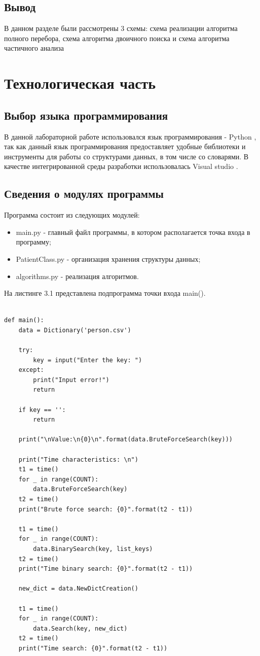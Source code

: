 \documentclass[12pt]{report}
\begin{document}
\section{Вывод}
В данном разделе были рассмотрены 3 схемы: схема реализации алгоритма полного перебора, схема алгоритма двоичного поиска и схема алгоритма частичного анализа 

\chapter{Технологическая часть}
\section{Выбор языка программирования}
В данной лабораторной работе использовался язык программирования - Python \cite{Python}, так как данный язык программирования предоставляет удобные библиотеки и инструменты для работы со структурами данных, в том числе со словарями. В качестве интегрированной среды разработки использовалась Visual studio \cite{Vs}.  

\section{Сведения о модулях программы}
Программа состоит из следующих модулей:
\begin{itemize}
	\item main.py - главный файл программы, в котором располагается точка входа в программу;
	\item PatientClass.py - организация хранения структуры данных;
	\item algorithms.py - реализация алгоритмов.
\end{itemize}

На листинге 3.1 представлена подпрограмма точки входа main().
\begin{lstlisting}[label=some-code,caption= Код подпрограммы main()]

def main():
    data = Dictionary('person.csv')

    try:
        key = input("Enter the key: ")
    except:
        print("Input error!")
        return

    if key == '':
        return

    print("\nValue:\n{0}\n".format(data.BruteForceSearch(key)))

    print("Time characteristics: \n")
    t1 = time()
    for _ in range(COUNT):
        data.BruteForceSearch(key)
    t2 = time()
    print("Brute force search: {0}".format(t2 - t1))
    
    t1 = time()
    for _ in range(COUNT):
        data.BinarySearch(key, list_keys)
    t2 = time()
    print("Time binary search: {0}".format(t2 - t1))
    
    new_dict = data.NewDictCreation()

    t1 = time()
    for _ in range(COUNT):
        data.Search(key, new_dict)
    t2 = time()
    print("Time search: {0}".format(t2 - t1))
\end{lstlisting}
\end{document}
